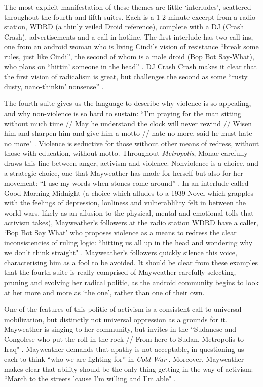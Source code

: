 \documentclass[a4paper, 11pt]{article} %
\begin{document}
The most explicit manifestation of these themes are little `interludes', scattered throughout the fourth and fifth suites.
Each is a 1-2 minute excerpt from a radio station, WDRD (a thinly veiled Droid reference), complete with a DJ (Crash Crash), advertisements and a call in hotline.
The first interlude has two call ins, one from an android woman who is living Cindi's vision of resistance ``break some rules, just like Cindi'', the second of whom is a male droid (Bop Bot Say-What), who plans on ``hittin' someone in the head'' \cite{goodmorningmidnight}.
DJ Crash Crash makes it clear that the first vision of radicalism is great, but challenges the second as some ``rusty dusty, nano-thinkin' nonsense'' \cite{goodmorningmidnight}.

The fourth suite gives us the language to describe why violence is so appealing, and why non-violence is so hard to sustain:
``I'm praying for the man sitting without much time // May he understand the clock will never rewind // Wisen him and sharpen him and give him a motto // hate no more, said he must hate no more" \cite{danceordie}.
Violence is seductive for those without other means of redress, without those with education, without motto.
Throughout \emph{Metropolis}, Monae carefully draws this line between anger, activism and violence.
Nonviolence is a choice, and a strategic choice, one that Mayweather has made for herself  but also for her movement: ``I use my words when stones come around'' \cite{manymoons}.
In an interlude called Good Morning Midnight (a choice which alludes to a 1939 Novel which grapples with the feelings of depression, lonliness and vulnerablility felt in between the world wars, likely as an allusion to the physical, mental and emotional tolls that activism takes), Mayweather's followers at the radio station WDRD have a caller, `Bop Bot Say What' who proposes violence as a means to redress the clear inconsistencies of ruling logic: ``hitting us all up in the head and wondering why we don't think straight" \cite{chromeshoppe}.
Mayweather's followers quickly silence this voice, characterising him as a fool to be avoided. 
It should be clear from these examples that the fourth suite is really comprised of Mayweather carefully selecting, pruning and evolving her radical politic, as the android community begins to look at her more and more as `the one', rather than one of their own.


One of the features of this politic of activism is a consistent call to universal mobilization, but distinctly not universal oppression as a grounds for it.
Mayweather is singing to her community, but invites in the 
``Sudanese and Congolese who put the roll in the rock // From here to Sudan, Metropolis to Iraq" \cite{danceordie}.
Mayweather demands that apathy is not acceptable, in questioning us each to think ``who we are fighting for'' in \emph{Cold War} \cite{coldwar}.
Moreover, Mayweather makes clear that ability should be the only thing getting in the way of activism: 
``March to the streets 'cause I'm willing and I'm able" \cite{queen}.
\end{document}
